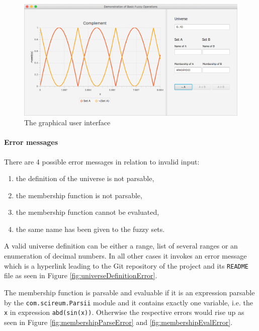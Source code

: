 \documentclass[12pt,a4paper,titlepage,final]{article}
\begin{document}
\noindent
\begin{figure}[h]
\centering
\includegraphics[width=1.0\textwidth]{img/gui}
\caption{The graphical user interface}
\label{fig:gui}
\end{figure}

\paragraph{Error messages}
There are 4 possible error messages in relation to invalid input:
\begin{enumerate}
\item the definition of the universe is not parsable,
\item the membership function is not parsable,
\item the membership function cannot be evaluated,
\item the same name has been given to the fuzzy sets.
\end{enumerate}

A valid universe definition can be either a range, list of several ranges or an enumeration of decimal numbers. In all other cases it invokes an error message which is a hyperlink leading to the Git repository of the project and its \texttt{README} file as seen in Figure \ref{fig:universeDefinitionError}.

The membership function is parsable and evaluable if it is an expression parsable by the \texttt{com.scireum.Parsii} module and it contains exactly one variable, i.e. the \verb|x| in expression \verb|abd(sin(x))|. Otherwise the respective errors would rise up as seen in Figure \ref{fig:membershipParseError} and \ref{fig:membershipEvalError}.
\end{document}
